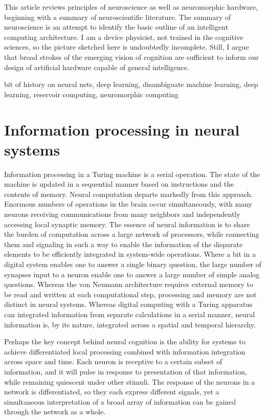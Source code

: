 \documentclass[twocolumn]{article}
\begin{document}
This article reviews principles of neuroscience as well as neuromorphic hardware, beginning with a summary of neuroscientific literature. The summary of neuroscience is an attempt to identify the basic outline of an intelligent computing architecture. I am a device physicist, not trained in the cognitive sciences, so the picture sketched here is undoubtedly incomplete. Still, I argue that broad strokes of the emerging vision of cognition are sufficient to inform our design of artificial hardware capable of general intelligence. 

\vspace{3em}
bit of history on neural nets, deep learning, disambiguate machine learning, deep learning, reservoir computing, neuromorphic computing

\section{\label{sec:neuroscience}Information processing in neural systems}
Information processing in a Turing machine is a serial operation. The state of the machine is updated in a sequential manner based on instructions and the contents of memory. Neural computation departs markedly from this approach. Enormous numbers of operations in the brain occur simultaneously, with many neurons receiving communications from many neighbors and independently accessing local synaptic memory. The essence of neural information is to share the burden of computation across a large network of processors, while connecting them and signaling in such a way to enable the information of the disparate elements to be efficiently integrated in system-wide operations. Where a bit in a digital system enables one to answer a single binary question, the large number of synapses input to a neuron enable one to answer a large number of simple analog questions. Whereas the von Neumann architecture requires external memory to be read and written at each computational step, processing and memory are not distinct in neural systems. Whereas digital computing with a Turing apparatus can integrated information from separate calculations in a serial manner, neural information is, by its nature, integrated across a spatial and temporal hierarchy.

Perhaps the key concept behind neural cognition is the ability for systems to achieve differentiated local processing combined with information integration across space and time. Each neuron is receptive to a certain subset of information, and it will pulse in response to presentation of that information, while remaining quiescent under other stimuli. The response of the neurons in a network is differentiated, so they each express different signals, yet a simultaneous interpretation of a broad array of information can be gained through the network as a whole. 
\end{document}
